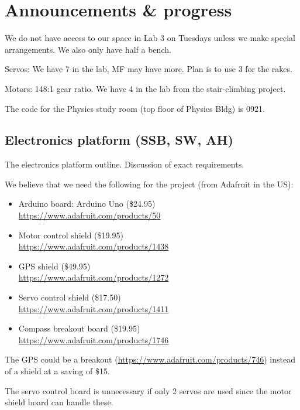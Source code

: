 \documentclass[a4paper,11pt,twoside,class=meetingmins,crop=false]{standalone}
\begin{document}
\section{Announcements \& progress}
\begin{items}
    \item We do not have access to our space in Lab 3 on Tuesdays unless we make special arrangements. We also only have half a bench.
    \item Servos: We have 7 in the lab, MF may have more. Plan is to use 3 for the rakes.
    \item Motors: 148:1 gear ratio. We have 4 in the lab from the stair-climbing project.
    \item The code for the Physics study room (top floor of Physics Bldg) is 0921.
\subsection{Electronics platform (SSB, SW, AH)}
    \item The electronics platform outline. Discussion of exact requirements.
\begin{hiddenitems}
    \item We believe that we need the following for the project (from Adafruit in the US):
    \begin{itemize}
        \item Arduino board: Arduino Uno (\${24.95})\\ \url{https://www.adafruit.com/products/50}
        \item Motor control shield (\${19.95})\\ \url{https://www.adafruit.com/products/1438}
        \item GPS shield (\${49.95})\\ \url{https://www.adafruit.com/products/1272}
        \item Servo control shield (\${17.50})\\ \url{https://www.adafruit.com/products/1411}
        \item Compass breakout board (\${19.95})\\ \url{https://www.adafruit.com/products/1746}
    \end{itemize}
    \item The GPS could be a breakout (\url{https://www.adafruit.com/products/746}) instead of a shield at a saving of \${15}.
    \item The servo control board is unnecessary if only 2 servos are used since the motor shield board can handle these.

\end{hiddenitems}
\end{items}
\end{document}
